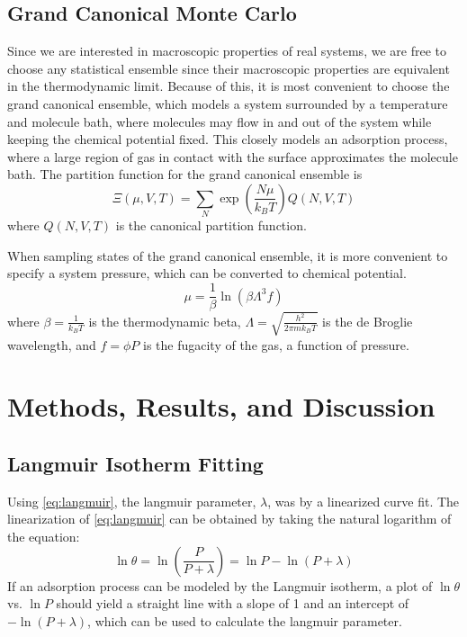 \documentclass{article}
\begin{document}
\subsection{Grand Canonical Monte Carlo}
Since we are interested in macroscopic properties of real systems, we are free to choose any statistical ensemble since their macroscopic properties are equivalent in the thermodynamic limit.
Because of this, it is most convenient to choose the grand canonical ensemble, which models a system surrounded by a temperature and molecule bath, where molecules may flow in and out of the system while keeping the chemical potential fixed. This closely models an adsorption process, where a large region of gas in contact with the surface approximates the molecule bath. The partition function for the grand canonical ensemble is
\begin{equation}
    \Xi(\mu, V, T) = \sum_N \exp\left(\frac{N\mu}{k_BT}\right)Q(N, V, T)
    \label{gc-partition}
\end{equation}
where $Q(N, V, T)$ is the canonical partition function.

When sampling states of the grand canonical ensemble, it is more convenient to specify a system pressure, which can be converted to chemical potential.
\begin{equation}
    \mu = \frac{1}{\beta}\ln\left(\beta\Lambda^3f\right)
\end{equation}
where $\beta = \frac{1}{k_BT}$ is the thermodynamic beta, $\Lambda = \sqrt{\frac{h^2}{2\pi mk_BT}}$ is the de Broglie wavelength, and $f = \phi P$ is the fugacity of the gas, a function of pressure.

\section{Methods, Results, and Discussion}
\subsection{Langmuir Isotherm Fitting}
Using \autoref{eq:langmuir}, the langmuir parameter, $\lambda$, was by a linearized curve fit. The linearization of \autoref{eq:langmuir} can be obtained by taking the natural logarithm of the equation:
\begin{equation}
    \ln\theta = \ln\left(\frac{P}{P+\lambda}\right) = \ln P - \ln(P + \lambda)
    \label{eq:linear-langmuir}
\end{equation}
If an adsorption process can be modeled by the Langmuir isotherm, a plot of $\ln\theta$ vs. $\ln P$ should yield a straight line with a slope of 1 and an intercept of $-\ln(P+\lambda)$, which can be used to calculate the langmuir parameter.
\end{document}
